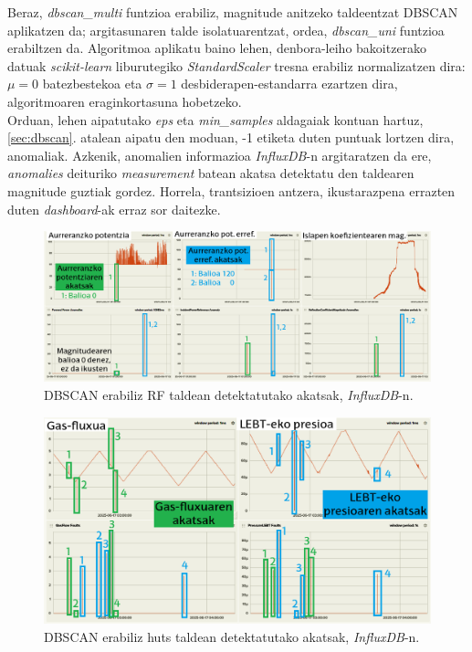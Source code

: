 \documentclass[12pt]{article}
\numberwithin{figure}{section}
\numberwithin{equation}{section}
\begin{document}
Beraz, \textit{dbscan\_multi} funtzioa erabiliz, magnitude anitzeko taldeentzat DBSCAN aplikatzen da; argitasunaren talde isolatuarentzat, ordea, \textit{dbscan\_uni} funtzioa erabiltzen da. Algoritmoa aplikatu baino lehen, denbora-leiho bakoitzerako datuak \textit{scikit-learn} liburutegiko \textit{StandardScaler} tresna erabiliz normalizatzen dira: $\mu=0$ batezbestekoa eta $\sigma=1$ desbiderapen-estandarra ezartzen dira, algoritmoaren eraginkortasuna hobetzeko.\\

Orduan, lehen aipatutako \textit{eps} eta \textit{min\_samples} aldagaiak kontuan hartuz, \ref{sec:dbscan}. atalean aipatu den moduan, -1 etiketa duten puntuak lortzen dira, anomaliak. Azkenik, anomalien informazioa \textit{InfluxDB}-n argitaratzen da ere, \textit{anomalies} deituriko \textit{measurement} batean akatsa detektatu den taldearen magnitude guztiak gordez. Horrela, trantsizioen antzera, ikustarazpena errazten duten \textit{dashboard}-ak erraz sor daitezke.
\newpage
\begin{figure}[h]
    \centering
    \includegraphics[width=\linewidth]{5 - Zerbitzuaren garapena/fault_dashboard_rf.png}
    \caption{DBSCAN erabiliz RF taldean detektatutako akatsak, \textit{InfluxDB}-n.}
    \label{fig:fault_rf}
\end{figure}
\begin{figure}[h]
    \centering
    \includegraphics[width=\linewidth]{5 - Zerbitzuaren garapena/fault_dashboard_void.png}
    \caption{DBSCAN erabiliz huts taldean detektatutako akatsak, \textit{InfluxDB}-n.}
    \label{fig:fault_void}
\end{figure}
\end{document}
